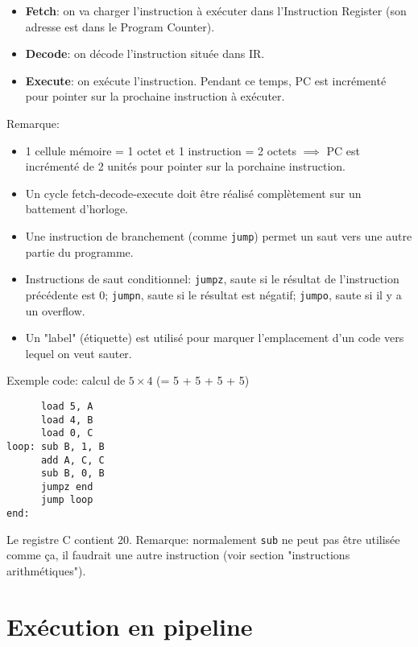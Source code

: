 \documentclass[a4paper]{article}
\begin{document}
\begin{itemize}
    \item \textbf{Fetch}: on va charger l'instruction à exécuter dans l'Instruction Register (son adresse est dans le Program Counter).
    \item \textbf{Decode}: on décode l'instruction située dans IR.
    \item \textbf{Execute}: on exécute l'instruction. Pendant ce temps, PC est incrémenté pour pointer sur la prochaine instruction à exécuter.
\end{itemize}
Remarque:
\begin{itemize}
    \item 1 cellule mémoire = 1 octet et 1 instruction = 2 octets $ \implies $ PC est incrémenté de 2 unités pour pointer sur la porchaine instruction.
    \item Un cycle fetch-decode-execute doit être réalisé complètement sur un battement d’horloge.
    \item Une instruction de branchement (comme \texttt{jump}) permet un saut vers une autre partie du programme.
    \item Instructions de saut conditionnel: \texttt{jumpz}, saute si le résultat de l'instruction précédente est 0; \texttt{jumpn}, saute si le résultat est négatif; \texttt{jumpo}, saute si il y a un overflow.
    \item Un "label" (étiquette) est utilisé pour marquer l'emplacement d'un code vers lequel on veut sauter.
\end{itemize}

\begin{example}
Exemple code: calcul de $ 5 \times 4 $ (= 5 + 5 + 5 + 5)
\begin{verbatim}
      load 5, A
      load 4, B
      load 0, C
loop: sub B, 1, B
      add A, C, C
      sub B, 0, B
      jumpz end
      jump loop
end:
\end{verbatim}
Le registre C contient 20. Remarque: normalement \texttt{sub} ne peut pas être utilisée comme ça, il faudrait une autre instruction (voir section "instructions arithmétiques").
\end{example}










\section{Exécution en pipeline}
\end{document}
